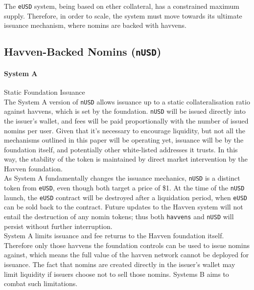 \noindent The \texttt{eUSD} system, being based on ether collateral, has a constrained
maximum supply. Therefore, in order to scale, the system must move towards its ultimate
issuance mechanism, where nomins are backed with havvens.

\pagebreak
\subsection{Havven-Backed Nomins (\texttt{nUSD})}

\paragraph{System A} Static Foundation Issuance \\

\noindent The System A version of \texttt{nUSD} allows issuance up to a static
collateralisation ratio against havvens, which is set by the foundation.
\texttt{nUSD} will be issued directly into the issuer's wallet, and fees will be paid
proportionally with the number of issued nomins per user. Given that it's necessary to
encourage liquidity, but not all the mechanisms outlined in this paper will be operating
yet, issuance will be by the foundation itself, and potentially other white-listed
addresses it trusts. In this way, the stability of the token is maintained by direct
market intervention by the Havven foundation. \\

\noindent As System A fundamentally changes the issuance mechanics, \texttt{nUSD} is a distinct
token from \texttt{eUSD}, even though both target a price of \$1. At the time of the \texttt{nUSD}
launch, the \texttt{eUSD} contract will be destroyed after a liquidation period, when \texttt{eUSD}
can be sold back to the contract. Future updates to the Havven system will not entail the
destruction of any nomin tokens; thus both \texttt{havvens} and \texttt{nUSD} will persist
without further interruption. \\

\noindent System A limits issuance and fee returns to the Havven foundation itself. Therefore
only those havvens the foundation controls can be used to issue nomins against, which means
the full value of the havven network cannot be deployed for issuance. The fact that nomins
are created directly in the issuer's wallet may limit liquidity if issuers choose not to sell
those nomins. Systems B aims to combat such limitations. \\



